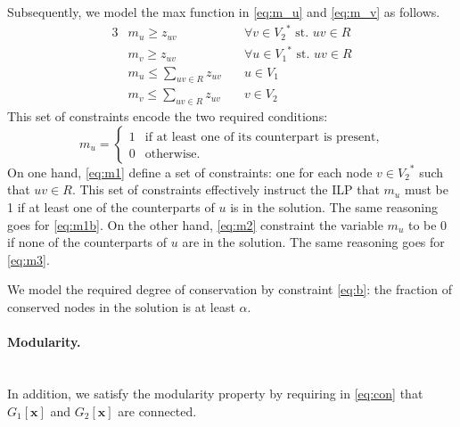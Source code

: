 		Subsequently, we model the max function in \eqref{eq:m_u} and \eqref{eq:m_v} as follows.
		\allowdisplaybreaks
		\begin{alignat}{3}
		\label{eq:m1}   & m_u \geq z_{uv}   & \forall v \in {V_2}^*\text{ st. }uv \in R\\
		\label{eq:m1b}  & m_v \geq z_{uv}   & \forall u \in {V_1}^*\text{ st. }uv \in R\\
		\label{eq:m2}   & m_u \leq \sum_{uv \in R}z_{uv}\quad  & u \in V_1\\
		\label{eq:m3}   & m_v \leq \sum_{uv \in R}z_{uv}  & v \in V_2
		\end{alignat}
		This set of constraints encode the two required conditions:
			\[
				m_u = \begin{cases}1 & \text{if at least one of its counterpart is present,}\\
				                   0 & \text{otherwise.}\end{cases}
			\]
		On one hand, \eqref{eq:m1} define a set of constraints: one for each node $v \in {V_2}^*$ such that $uv\in R$. This set of constraints effectively instruct the ILP that $m_u$ must be 1 if at least one of the counterparts of $u$ is in the solution.
		The same reasoning goes for \eqref{eq:m1b}.
		On the other hand, \eqref{eq:m2} constraint the variable $m_u$ to be 0 if none of the counterparts of $u$ are in the solution.
		The same reasoning goes for \eqref{eq:m3}.

		We model the required degree of conservation by constraint \eqref{eq:b}: the fraction of conserved nodes in the solution is at least $\alpha$.

		\paragraph{Modularity.}\mbox{}\\
		In addition, we satisfy the modularity property by requiring in \eqref{eq:con} that $G_1[\mathbf{x}]$ and $G_2[\mathbf{x}]$ are connected.

